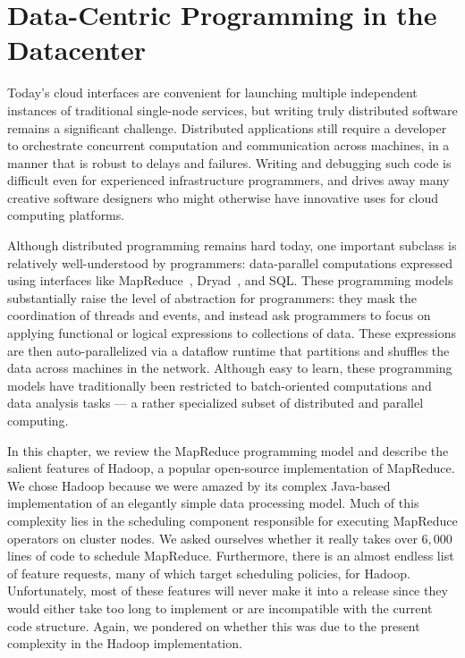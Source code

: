 \chapter[Data-Centric Programming in the Datacenter]{Data-Centric Programming in the Datacenter}
\label{ch:mrback}

Today's cloud interfaces are convenient for launching multiple independent
instances of traditional single-node services, but writing truly distributed
software remains a significant challenge.  Distributed applications still
require a developer to orchestrate concurrent computation and communication
across machines, in a manner that is robust to delays and failures.  Writing and
debugging such code is difficult even for experienced infrastructure
programmers, and drives away many creative software designers who might
otherwise have innovative uses for cloud computing platforms.

Although distributed programming remains hard today, one important subclass is
relatively well-understood by programmers: data-parallel computations expressed
using interfaces like MapReduce~\cite{mapreduce-osdi}, Dryad~\cite{dryad}, and
SQL\@.  These programming models substantially raise the level of abstraction
for programmers: they mask the coordination of threads and events, and instead
ask programmers to focus on applying functional or logical expressions to
collections of data.  These expressions are then auto-parallelized via a
dataflow runtime that partitions and shuffles the data across machines in the
network. Although easy to learn, these programming models have traditionally
been restricted to batch-oriented computations and data analysis tasks --- a
rather specialized subset of distributed and parallel computing.

In this chapter, we review the MapReduce programming model and describe the
salient features of Hadoop, a popular open-source implementation of MapReduce.
We chose Hadoop because we were amazed by its complex Java-based implementation of
an elegantly simple data processing model. Much of this complexity lies in the scheduling
component responsible for executing MapReduce operators on cluster nodes. We asked ourselves
whether it really takes over $6,000$ lines of code to schedule MapReduce. Furthermore, there is an almost 
endless list of feature requests, many of which target scheduling policies, for Hadoop. Unfortunately,
most of these features will never make it into a release since they would either take too long to 
implement or are incompatible with the current code structure. Again, we pondered on whether this 
was due to the present complexity in the Hadoop implementation.


